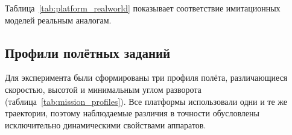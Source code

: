 Таблица~\ref{tab:platform_realworld} показывает соответствие имитационных моделей реальным аналогам.

\begin{table}[htbp]
	\centering
	\footnotesize
	\caption{Соответствие имитационных моделей реальным платформам.}
	\label{tab:platform_realworld}
	\setlength{\tabcolsep}{3pt}
\end{table}


\subsection{Профили полётных заданий}

Для эксперимента были сформированы три профиля полёта, различающиеся скоростью, высотой и минимальным углом разворота (таблица~\ref{tab:mission_profiles}). Все платформы использовали одни и те же траектории, поэтому наблюдаемые различия в точности обусловлены исключительно динамическими свойствами аппаратов.

\begin{table}[htbp]
	\centering
	\footnotesize
	\caption{Параметры профилей полётных заданий. Минимальный угол разворота обеспечивает резкие изменения курса и увеличивает разницу оборотов между парами роторов.}
	\label{tab:mission_profiles}
	\setlength{\tabcolsep}{3pt}
\end{table}
